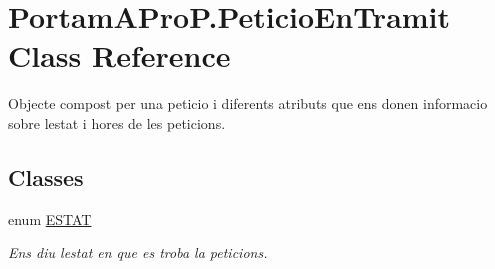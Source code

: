 \hypertarget{class_portam_a_pro_p_1_1_peticio_en_tramit}{}\section{Portam\+A\+Pro\+P.\+Peticio\+En\+Tramit Class Reference}
\label{class_portam_a_pro_p_1_1_peticio_en_tramit}


Objecte compost per una peticio i diferents atributs que ens donen informacio sobre l\textquotesingle{}estat i hores de les peticions.  


\subsection*{Classes}
\begin{DoxyCompactItemize}
\item 
enum \hyperlink{enum_portam_a_pro_p_1_1_peticio_en_tramit_1_1_e_s_t_a_t}{E\+S\+T\+AT}
\begin{DoxyCompactList}\small\item\em Ens diu l\textquotesingle{}estat en que es troba la peticions. \end{DoxyCompactList}\end{DoxyCompactItemize}
